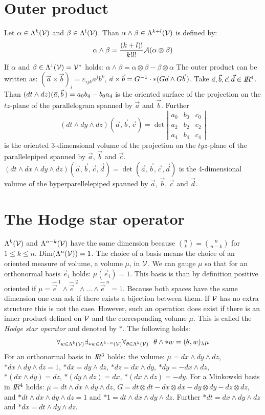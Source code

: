 \documentclass[twoside]{report}
\begin{document}
\section{Outer product}
Let $\alpha\in\Lambda^k(\cal V)$ and $\beta\in\Lambda^l(\cal V)$. Than
$\alpha\wedge\beta\in\Lambda^{k+l}(\cal V)$ is defined by:
\[
\alpha\wedge\beta=\frac{(k+l)!}{k!l!}{\cal A}(\alpha\otimes\beta)
\]
If $\alpha$ and $\beta\in\Lambda^1(\cal V)={\cal V}^*$ holds:
$\alpha\wedge\beta=\alpha\otimes\beta-\beta\otimes\alpha$
\npar
The outer product can be written as: $(\vec{a}\times\vec{b})_i=\varepsilon_{ijk}a^jb^k$,
$\vec{a}\times\vec{b}=G^{-1}\cdot*(G\vec{a}\wedge G\vec{b}\,)$.
\npar
Take $\vec{a},\vec{b},\vec{c},\vec{d}\in I\hspace{-1mm}R^4$. Than
$(dt\wedge dz)(\vec{a},\vec{b}\,)=a_0b_4-b_0a_4$ is the oriented surface of the
projection on the $tz$-plane of the parallelogram spanned by $\vec{a}$ and
$\vec{b}$.
\npar
Further
\[
(dt\wedge dy\wedge dz)(\vec{a},\vec{b},\vec{c})=\det\left|\begin{array}{ccc}
a_0&b_0&c_0\\ a_2&b_2&c_2\\ a_4&b_4&c_4 \end{array}\right|
\]
is the oriented 3-dimensional volume of the projection on the $tyz$-plane of
the parallelepiped spanned by $\vec{a}$, $\vec{b}$ and $\vec{c}$.
\npar
$(dt\wedge dx\wedge dy\wedge dz)(\vec{a},\vec{b},\vec{c},\vec{d})=\det(\vec{a},\vec{b},\vec{c},\vec{d})$
is the 4-dimensional volume of the hyperparellelepiped spanned by
$\vec{a}$, $\vec{b}$, $\vec{c}$ and $\vec{d}$.

\section{The Hodge star operator}
$\Lambda^k(\cal V)$ and $\Lambda^{n-k}(\cal V)$ have the same dimension
because ${n\choose k}={n\choose{n-k}}$ for $1\leq k\leq n$.
Dim$(\Lambda^n({\cal V}))=1$. The choice of a basis means the choice of an oriented
measure of volume, a volume $\mu$, in $\cal V$. We can gauge $\mu$ so that for
an orthonormal basis $\vec{e}_i$ holds: $\mu(\vec{e}_i)=1$. This basis is than
by definition positive oriented if
$\mu=\hat{\vec{e}}^{~1}\wedge \hat{\vec{e}}^{~2}\wedge...\wedge \hat{\vec{e}}^{~n}=1$.
\npar
Because both spaces have the same dimension one can ask if there exists a
bijection between them. If $\cal V$ has no extra structure this is not the
case. However, such an operation does exist if there is an inner product
defined on $\cal V$ and the corresponding volume $\mu$. This is called
the {\it Hodge star operator} and denoted by $*$. The following holds:
\[
\forall_{w\in\Lambda^k({\cal V})}\exists_{*w\in\Lambda^{k-n}({\cal V})}\forall_{\theta\in\Lambda^k({\cal V})}~~
\theta\wedge*w=(\theta,w)_\lambda\mu
\]
For an orthonormal basis in $I\hspace{-1mm}R^3$ holds: the volume: $\mu=dx\wedge dy\wedge dz$,
$*dx\wedge dy\wedge dz=1$, $*dx=dy\wedge dz$, $*dz=dx\wedge dy$, $*dy=-dx\wedge dz$,
$*(dx\wedge dy)=dz$, $*(dy\wedge dz)=dx$, $*(dx\wedge dz)=-dy$.
\npar
For a Minkowski basis in $I\hspace{-1mm}R^4$ holds: $\mu=dt\wedge dx\wedge dy\wedge dz$,
$G=dt\otimes dt-dx\otimes dx-dy\otimes dy-dz\otimes dz$, and
$*dt\wedge dx\wedge dy\wedge dz=1$ and $*1=dt\wedge dx\wedge dy\wedge dz$.
Further $*dt=dx\wedge dy\wedge dz$ and $*dx=dt\wedge dy\wedge dz$.
\end{document}
